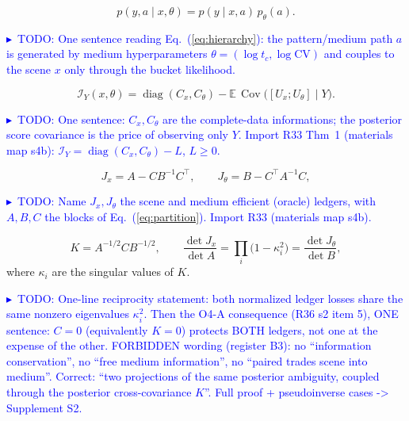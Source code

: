 \documentclass[10pt,twocolumn]{article}
\newcommand{\TODOc}[1]{\par\smallskip\noindent\textcolor{blue}{\footnotesize$\blacktriangleright$~TODO: #1}\par\smallskip}
\newcommand{\tc}{t_{c}}
\begin{document}
\begin{equation}
  p(y,a\mid x,\theta)=p(y\mid x,a)\,p_\theta(a).
  \label{eq:hierarchy}
\end{equation}
\TODOc{One sentence reading Eq.~(\ref{eq:hierarchy}): the pattern/medium path
$a$ is generated by medium hyperparameters $\theta=(\log\tc,\log\mathrm{CV})$ and
couples to the scene $x$ only through the bucket likelihood.}

\begin{equation}
  \mathcal{I}_Y(x,\theta)=\operatorname{diag}(C_x,C_\theta)
    -\mathbb{E}\,\operatorname{Cov}\!\big([U_x;U_\theta]\mid Y\big).
  \label{eq:partition}
\end{equation}
\TODOc{One sentence: $C_x,C_\theta$ are the complete-data informations; the
posterior score covariance is the price of observing only $Y$. Import R33 Thm~1
(materials map s4b): $\mathcal{I}_Y=\operatorname{diag}(C_x,C_\theta)-L$, $L\ge0$.}

\begin{equation}
  J_x=A-CB^{-1}C^{\top},\qquad J_\theta=B-C^{\top}A^{-1}C,
  \label{eq:schur}
\end{equation}
\TODOc{Name $J_x,J_\theta$ the scene and medium efficient (oracle) ledgers, with
$A,B,C$ the blocks of Eq.~(\ref{eq:partition}). Import R33 (materials map s4b).}

\begin{equation}
  K=A^{-1/2}CB^{-1/2},\qquad
  \frac{\det J_x}{\det A}=\prod_i\big(1-\kappa_i^2\big)=\frac{\det J_\theta}{\det B},
  \label{eq:reciprocity}
\end{equation}
where $\kappa_i$ are the singular values of $K$. %
\TODOc{One-line reciprocity statement: both normalized ledger losses share the
same nonzero eigenvalues $\kappa_i^2$. Then the O4-A consequence (R36 s2 item 5),
ONE sentence: $C=0$ (equivalently $K=0$) protects BOTH ledgers, not one at the
expense of the other. FORBIDDEN wording (register B3): no ``information
conservation'', no ``free medium information'', no ``paired trades scene into
medium''. Correct: ``two projections of the same posterior ambiguity, coupled
through the posterior cross-covariance $K$''. Full proof + pseudoinverse cases
-> Supplement S2.}
\end{document}

